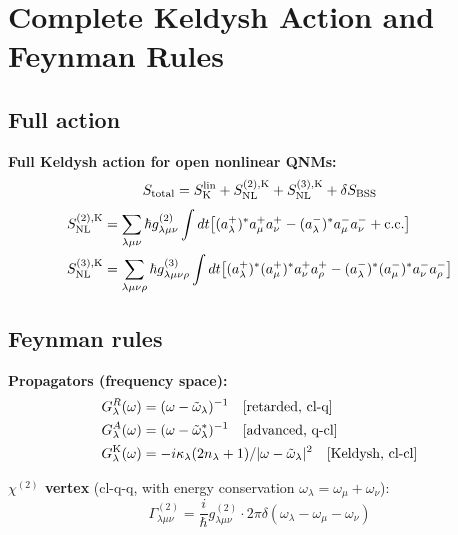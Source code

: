 \documentclass[12pt]{article}
\newcommand{\NL}{{\rm NL}}
\newcommand{\Keldysh}{{\rm K}}
\newcommand{\BSS}{{\rm BSS}}
\newcommand{\tomega}{\tilde{\omega}}
\begin{document}
\section{Complete Keldysh Action and Feynman Rules}
\label{sec:feynman}

\subsection{Full action}

\begin{keyresult}
\textbf{Full Keldysh action for open nonlinear QNMs:}
\begin{equation}
  S_{\rm total} =
  S_\Keldysh^{\rm lin}+S_\NL^{(2),\Keldysh}+S_\NL^{(3),\Keldysh}
  +\delta S_\BSS
  \label{eq:full_action}
\end{equation}
\begin{align}
  S_\NL^{(2),\Keldysh} &= \sum_{\lambda\mu\nu}\hbar g^{(2)}_{\lambda\mu\nu}
  \int dt\bigl[(a_\lambda^+)^*a_\mu^+a_\nu^+
  -(a_\lambda^-)^*a_\mu^-a_\nu^-+\mathrm{c.c.}\bigr]
  \label{eq:chi2_keldysh}\\
  S_\NL^{(3),\Keldysh} &= \sum_{\lambda\mu\nu\rho}\hbar g^{(3)}_{\lambda\mu\nu\rho}
  \int dt\bigl[(a_\lambda^+)^*(a_\mu^+)^*a_\nu^+a_\rho^+
  -(a_\lambda^-)^*(a_\mu^-)^*a_\nu^-a_\rho^-\bigr]
  \label{eq:chi3_keldysh}
\end{align}
\end{keyresult}

\subsection{Feynman rules}

\textbf{Propagators (frequency space):}
\begin{align}
  G_\lambda^R(\omega) &= (\omega-\tomega_\lambda)^{-1}
  \quad\text{[retarded, cl-q]}\\
  G_\lambda^A(\omega) &= (\omega-\tomega_\lambda^*)^{-1}
  \quad\text{[advanced, q-cl]}\\
  G_\lambda^\Keldysh(\omega) &=
  -i\kappa_\lambda(2n_\lambda+1)/|\omega-\tomega_\lambda|^2
  \quad\text{[Keldysh, cl-cl]}
\end{align}

\textbf{$\chi^{(2)}$ vertex} (cl-q-q, with energy conservation
$\omega_\lambda=\omega_\mu+\omega_\nu$):
\begin{equation}
  \Gamma^{(2)}_{\lambda\mu\nu} =
  \frac{i}{\hbar}g^{(2)}_{\lambda\mu\nu}\cdot
  2\pi\delta(\omega_\lambda-\omega_\mu-\omega_\nu)
\end{equation}
\end{document}
